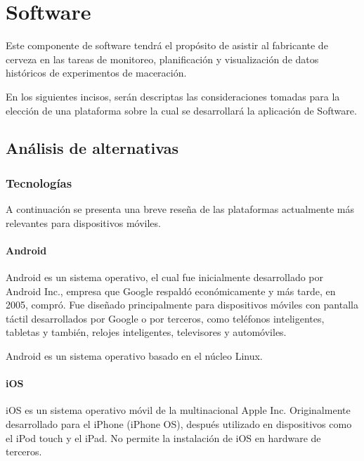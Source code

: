 \chapter{Software}
\par Este componente de software tendrá el propósito de asistir al fabricante de cerveza en las tareas de monitoreo, planificación y visualización de datos históricos de experimentos de maceración.

\par En los siguientes incisos, serán descriptas las consideraciones tomadas para la elección de una plataforma sobre la cual se desarrollará la aplicación de Software.

\section{Análisis de alternativas}
    \subsection{Tecnologías}
        \par A continuación se presenta una breve reseña de las plataformas actualmente más relevantes para dispositivos móviles.
        
        \subsubsection{Android}
            \par Android es un sistema operativo, el cual fue inicialmente desarrollado por Android Inc., empresa que Google respaldó económicamente y más tarde, en 2005, compró. Fue diseñado principalmente para dispositivos móviles con pantalla táctil desarrollados por Google o por terceros, como teléfonos inteligentes, tabletas y también, relojes inteligentes, televisores y automóviles. 
            
            \par Android es un sistema operativo basado en el núcleo Linux.
            
        \subsubsection{iOS}
            \par iOS es un sistema operativo móvil de la multinacional Apple Inc. Originalmente desarrollado para el iPhone (iPhone OS), después utilizado en dispositivos como el iPod touch y el iPad. No permite la instalación de iOS en hardware de terceros.
            
